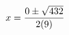 \documentclass[preview]{standalone}
\begin{document}
\begin{align*}
\special{dvisvgm:raw <g id='unique000'>}x=\frac{0\pm\sqrt{432}}{2(9)}\special{dvisvgm:raw </g>}
\end{align*}
\end{document}
